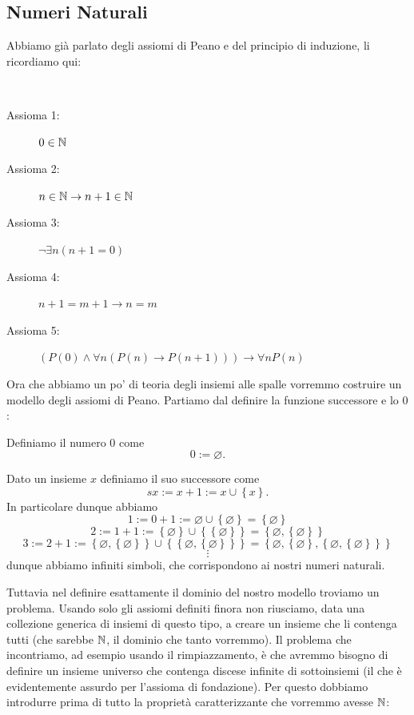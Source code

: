 \documentclass[11pt]{scrartcl}
\newcommand{\eset}{\varnothing}
\begin{document}
	\subsection{Numeri Naturali}
	
	Abbiamo già parlato degli assiomi di Peano e del principio di induzione, li ricordiamo qui:
	\begin{definition}
		$\,$
		\begin{description}
			\item[Assioma 1:] $0\in\mathbb N$
			\item[Assioma 2:] $n\in\mathbb N \to n+1\in\mathbb N$
			\item[Assioma 3:] $\lnot\exists n (n+1=0)$
			\item[Assioma 4:] $n+1=m+1 \to n=m$
			\item[Assioma 5:] $\left(P(0)\land \forall n \left(P(n)\to P(n+1)\right)\right)\to \forall n P(n)$
		\end{description}
	\end{definition} Ora che abbiamo un po' di teoria degli insiemi alle spalle vorremmo costruire un modello degli assiomi di Peano. Partiamo dal definire la funzione successore e lo $0$:
	\begin{definition}[Numero $0$]
		Definiamo il numero $0$ come
		$$0:=\eset.$$
		
	\end{definition}
	\begin{definition}
		Dato un insieme $x$ definiamo il suo successore come
		$$sx:=x+1:=x\cup \left\{x\right\}.$$
		In particolare dunque abbiamo
		$$1:=0+1:=\eset\cup \left\{\eset\right\}=\left\{\eset\right\}$$
		$$2:=1+1:=\left\{\eset\right\}\cup \left\{\left\{\eset\right\}\right\}=\left\{\eset,\left\{\eset\right\}\right\}$$
		$$3:=2+1:=\left\{\eset,\left\{\eset\right\}\right\}\cup \left\{\left\{\eset,\left\{\eset\right\}\right\}\right\}=\left\{\eset,\left\{\eset\right\},\left\{\eset,\left\{\eset\right\}\right\}\right\}$$
		$$\vdots$$
		dunque abbiamo infiniti simboli, che corrispondono ai nostri numeri naturali.
	\end{definition}
	Tuttavia nel definire esattamente il dominio del nostro modello troviamo un problema. Usando solo gli assiomi definiti finora non riusciamo, data una collezione generica di insiemi di questo tipo, a creare un insieme che li contenga tutti (che sarebbe $\mathbb N$, il dominio che tanto vorremmo). Il problema che incontriamo, ad esempio usando il rimpiazzamento, è che avremmo bisogno di definire un insieme universo che contenga discese infinite di sottoinsiemi (il che è evidentemente assurdo per l'assioma di fondazione). Per questo dobbiamo introdurre prima di tutto la proprietà caratterizzante che vorremmo avesse $\mathbb N$:
\end{document}
